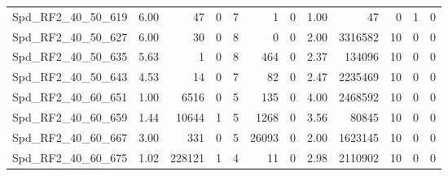 \begin{longtable}[c]{@{}lrrrrrrrrrrr@{}}
Spd\_RF2\_40\_50\_619         & 6.00                   & 47                      & 0                       & 7                      & 1                       & 0                       & 1.00                    & 47                       & 0                        & 1                        & 0                        \\
Spd\_RF2\_40\_50\_627         & 6.00                   & 30                      & 0                       & 8                      & 0                       & 0                       & 2.00                    & 3316582                  & 10                       & 0                        & 0                        \\
Spd\_RF2\_40\_50\_635         & 5.63                   & 1                       & 0                       & 8                      & 464                     & 0                       & 2.37                    & 134096                   & 10                       & 0                        & 0                        \\
Spd\_RF2\_40\_50\_643         & 4.53                   & 14                      & 0                       & 7                      & 82                      & 0                       & 2.47                    & 2235469                  & 10                       & 0                        & 0                        \\
Spd\_RF2\_40\_60\_651         & 1.00                   & 6516                    & 0                       & 5                      & 135                     & 0                       & 4.00                    & 2468592                  & 10                       & 0                        & 0                        \\
Spd\_RF2\_40\_60\_659         & 1.44                   & 10644                   & 1                       & 5                      & 1268                    & 0                       & 3.56                    & 80845                    & 10                       & 0                        & 0                        \\
Spd\_RF2\_40\_60\_667         & 3.00                   & 331                     & 0                       & 5                      & 26093                   & 0                       & 2.00                    & 1623145                  & 10                       & 0                        & 0                        \\
Spd\_RF2\_40\_60\_675         & 1.02                   & 228121                  & 1                       & 4                      & 11                      & 0                       & 2.98                    & 2110902                  & 10                       & 0                        & 0                        \\

\end{longtable}
